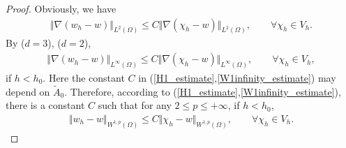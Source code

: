 \documentclass[12pt]{amsart}
\theoremstyle{definition}
\theoremstyle{remark}
\begin{document}
\begin{proof}
Obviously, we have 
\begin{align}
\label{H1_estimate}
\Vert \nabla (w_{h} - w)\Vert_{L^{2}(\Omega)} \leq C \Vert \nabla(\chi_{h} - w) 
\Vert_{L^{2}(\Omega)}, \qquad \forall \chi_{h} \in V_{h}.
\end{align}
By \cite[Theorem~$2$]{GLRS2009} ($d=3$), \cite[Theorem~$2$]{Schatz1980} 
($d=2$), 
\begin{align}
\label{W1infinity_estimate}
\Vert \nabla (w_{h} - w)\Vert_{L^{\infty}(\Omega)} \leq C \Vert \nabla(\chi_{h} - w) 
\Vert_{L^{\infty}(\Omega)}, \qquad \forall \chi_{h} \in V_{h},
\end{align}
if $h <h_{0}$. Here the constant $C$ in (\ref{H1_estimate},\ref{W1infinity_estimate}) may depend on $\tilde{A}_{0}$.
Therefore, according to (\ref{H1_estimate},\ref{W1infinity_estimate}), 
there is a constant $C$ such that for any $2 \leq p \leq +\infty$, if $h<h_{0}$,
\begin{align}
\label{W1p_estimate_1}
\Vert w_{h} - w \Vert_{W^{1,p}(\Omega)} \leq C \Vert \chi_{h} - w \Vert_{W^{1,p}(\Omega)}, 
\qquad \forall \chi_{h} \in V_{h}.
\end{align}


\end{proof}
\end{document}
